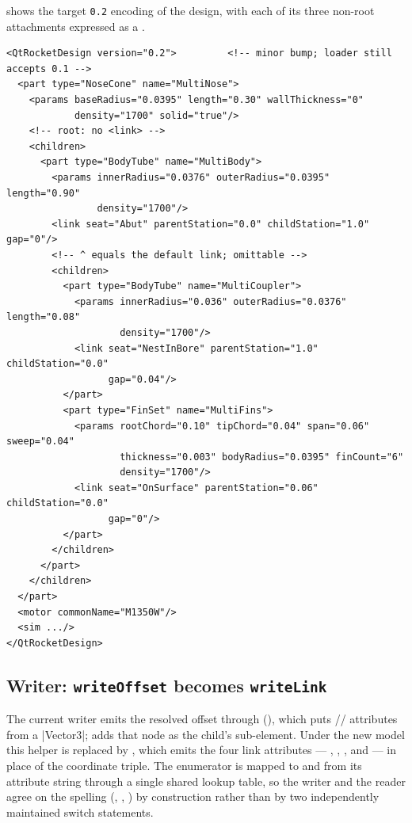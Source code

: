  shows the target \texttt{0.2} encoding of the  design,
with each of its three non-root attachments expressed as a .

\begin{listing}[htbp]
\begin{verbatim}
<QtRocketDesign version="0.2">         <!-- minor bump; loader still accepts 0.1 -->
  <part type="NoseCone" name="MultiNose">
    <params baseRadius="0.0395" length="0.30" wallThickness="0"
            density="1700" solid="true"/>
    <!-- root: no <link> -->
    <children>
      <part type="BodyTube" name="MultiBody">
        <params innerRadius="0.0376" outerRadius="0.0395" length="0.90"
                density="1700"/>
        <link seat="Abut" parentStation="0.0" childStation="1.0" gap="0"/>
        <!-- ^ equals the default link; omittable -->
        <children>
          <part type="BodyTube" name="MultiCoupler">
            <params innerRadius="0.036" outerRadius="0.0376" length="0.08"
                    density="1700"/>
            <link seat="NestInBore" parentStation="1.0" childStation="0.0"
                  gap="0.04"/>
          </part>
          <part type="FinSet" name="MultiFins">
            <params rootChord="0.10" tipChord="0.04" span="0.06" sweep="0.04"
                    thickness="0.003" bodyRadius="0.0395" finCount="6"
                    density="1700"/>
            <link seat="OnSurface" parentStation="0.06" childStation="0.0"
                  gap="0"/>
          </part>
        </children>
      </part>
    </children>
  </part>
  <motor commonName="M1350W"/>
  <sim .../>
</QtRocketDesign>
\end{verbatim}
\caption{The  design in the target \texttt{0.2} format. Each child's
spatial relationship is an intent-bearing , never a resolved coordinate.
The root carries no link; the body's link equals the default and could be omitted.}
\label{lst:qrd}
\end{listing}

\subsection{Writer: \texttt{writeOffset} becomes \texttt{writeLink}}

The current writer emits the resolved offset through 
(), which puts // attributes
from a \cppinline|Vector3|;  adds that node as the child's 
sub-element. Under the new model this helper is replaced by
, which emits the four link attributes ---
, , , and  --- in place of
the coordinate triple. The \seat{} enumerator is mapped to and from its attribute string
through a single shared lookup table, so the writer and the reader agree on the
spelling (, , ) by construction rather than
by two independently maintained switch statements.

